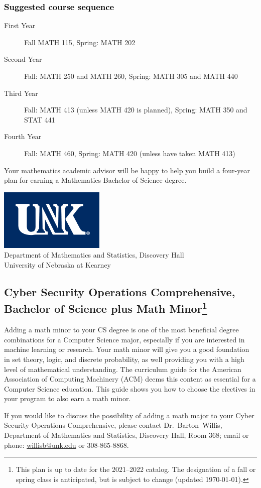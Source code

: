 \documentclass[10pt]{article}
\makeatletter
\newenvironment{mypar}[2]
   {\begin{list}{}%
     {\setlength\leftmargin{#1}
     \setlength\rightmargin{#2}}
     \item[]}
   {\end{list}}
\newcommand{\contactbw}{\mbox{Dr.\ Barton Willis}, Department of Mathematics and Statistics,  Discovery Hall, Room 368;
email or phone: \href{mailto:willisb@unk.edu}{willisb@unk.edu} or 308-865-8868.}
\newcommand{\forinfo}[2]{If you would like to discuss the possibility of adding a math {#1} to your {#2}, please contact \contactbw}
\newcommand{\catalog}{2021--2022 }
\newcommand{\myfootnote}{\footnote{This plan is up to date for  the \catalog catalog. The designation of a fall or spring class is 
anticipated, but  is subject to change (updated  \today).}}
\newcommand{\myheading}{
\begin{flushleft}
\includegraphics[scale=0.35]{unk-logo}\\
\setcounter{footnote}{0}
\vspace{0.25in}
 \textcolor{unkblue}{Department of Mathematics and Statistics, Discovery Hall} \\
  \textcolor{unkblue}{University of Nebraska at Kearney}
\end{flushleft}}
\makeatother
\begin{document}
\subsubsection*{\textcolor{black}{Suggested course sequence}}

\begin{description}
   \item[\phantom{xxx} First  Year] Fall MATH 115, Spring: MATH 202
      \item[\phantom{xxx} Second Year]  Fall: MATH 250 and MATH 260,   Spring: MATH 305 and MATH 440
     \item[\phantom{xxx} Third  Year]  Fall: MATH 413 (unless MATH 420 is planned),  Spring: MATH 350 and STAT 441
      \item[\phantom{xxx} Fourth Year]  Fall: MATH 460,  Spring: MATH 420 (unless have taken MATH 413)
 \end{description}

\begin{mypar}{0.5cm}{0.5cm}  Your mathematics academic advisor will be happy to help you build a four-year plan for earning a Mathematics Bachelor of Science degree.

\end{mypar}
\newpage



\myheading

\subsection*{\textbf{\textcolor{unkblue}{Cyber Security Operations Comprehensive, Bachelor of Science plus Math Minor\myfootnote}}}

Adding a math minor to your CS degree is one of the most beneficial degree combinations for a Computer Science major, especially if you are interested in machine learning or research.  Your math minor will give you a good foundation in set theory, logic, and discrete probability, as well providing you with a high level of mathematical understanding. The curriculum guide for the American Association of Computing Machinery (ACM) deems  this
content  as essential for  a Computer Science education. This guide shows you how to choose the electives in your program to also earn a math minor.
 
 \forinfo{major}{Cyber Security Operations Comprehensive}


\vspace{-0.1in}
\end{document}
